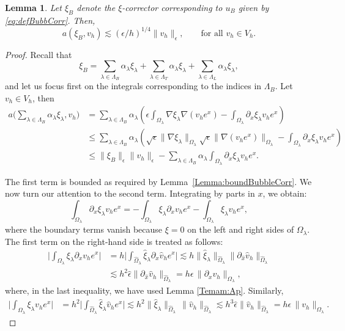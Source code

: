 \documentclass{article}
\newtheorem{lemma}[thm]{Lemma}
\newcommand{\summLA}[1][{}]{\ensuremath{\sum_{\lambda\in\Lambda_{#1}}\alpha_\lambda}}
\begin{document}
\begin{lemma}\label{Lemma:11}
Let $\xi_B$ denote the $\xi$-corrector corresponding to $u_B$ given by \eqref{eq:defBubbCorr}.
Then,
$$
 a(\xi_B,v_h) \lesssim (\epsilon/h)^{1/4} \|v_h\|_\epsilon, \qquad \text{for all $v_h \in V_h$}.
$$
\end{lemma}

\begin{proof}
Recall that
\[\xi_B = \summLA[B]\xi_\lambda+ \summLA[T]\xi_\lambda+
\summLA[L]\xi_\lambda,\]
and let us focus first on the integrals corresponding to the indices in $\Lambda_B$. 
Let $v_h\in V_h$, then
\begin{equation*}
\begin{aligned}
a\Big(\summLA[B]\xi_\lambda,v_h\Big) &=
        \summLA[B]
        \left( \epsilon \int_{\Omega_\lambda} \nabla\xi_\lambda \nabla (v_h e^x)
        - \int_{\Omega_\lambda} \partial_x \xi_\lambda v_h e^x \right)\\
        &\le
        \summLA[B]
        \left( \sqrt{\epsilon} \| \nabla\xi_\lambda\|_{\Omega_\lambda} \sqrt{\epsilon}\|\nabla (v_h e^x)\|_{\Omega_\lambda}
        - \int_{\Omega_\lambda} \partial_x \xi_\lambda v_h e^x \right)\\
        &\le
        \|\xi_B\|_\epsilon
    \|v_h\|_\epsilon- \summLA[B]\int_{\Omega_\lambda} \partial_x \xi_\lambda v_h e^x .
\end{aligned}
\end{equation*}

The first term is bounded as required by Lemma~\ref{Lemma:boundBubbleCorr}. We now turn our attention to the second term. Integrating by parts in $x$, we obtain:
$$
  \int_{\Omega_\lambda} \partial_x \xi_\lambda v_h e^x =   -\int_{\Omega_\lambda} \xi_\lambda \partial_x v_h e^x - \int_{\Omega_\lambda} \xi_\lambda  v_h e^x,
$$
where the boundary terms vanish because $\xi=0$ on the left and right sides of $\Omega_\lambda$.
The first term on the right-hand side is treated as follows:
$$
\begin{aligned}
   \Big|\int_{\Omega_\lambda} \xi_\lambda \partial_x v_h e^x \Big| 
   &= h \Big|
   \int_{\hat{\Omega}_\lambda} \hat{\xi}_\lambda \partial_{\hat{x}} \hat{v}_h e^x\Big|
   \lesssim
     h \|\hat{\xi}_\lambda\|_{\hat{\Omega}_\lambda} \| \partial_{\hat{x}} \hat{v}_h \|_{\hat{\Omega}_\lambda} \\
   &\lesssim  h^2 \hat{\epsilon} \|\partial_{\hat{x}} \hat{v}_h \|_{\hat{\Omega}_\lambda} 
   =
   h\epsilon \, \|\partial_x v_h \|_{\Omega_\lambda},
\end{aligned}
$$
where, in the last inequality, we have used Lemma \ref{Temam:Ap}.
Similarly,
$$
\begin{aligned}
   \Big|\int_{\Omega_\lambda} \xi_\lambda  v_h e^x  \Big|&= h^2 \Big|\int_{\hat{\Omega}_\lambda} \hat{\xi}_\lambda  \hat{v}_h e^x\Big|\lesssim
    h^2 \|\hat{\xi}_\lambda\|_{\hat{\Omega}_\lambda} \, \| \hat{v}_h \|_{\hat{\Omega}_\lambda}
  \lesssim  h^3 \hat{\epsilon} \|\hat{v}_h \|_{\hat{\Omega}_\lambda} 
  =
   h\epsilon \, \| v_h \|_{\Omega_\lambda}.
\end{aligned}
$$


\end{proof}
\end{document}
